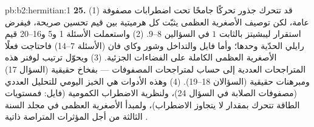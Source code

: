 \begin{solution}{pb:b2:hermitian:1}
\textbf{25.} (1) قد تتحرك جذور 
تحركًا جامحًا تحت اضطرابات مصفوفة عامة، لكن
توصيف الأصغرية العظمى يثبّت كل  هرميتية بين
قيم تحسين صريحة، فيفرض استقرار ليبشيتز
بالثابت $1$ في السؤالين 8--9. (2) واستعملت الأسئلة 1 و5 و16--20
قيم رايلي الحدّية وحدها؛ وأما فايل والتداخل وشور
وكاي فان (الأسئلة 7--14) فاحتاجت فعلًا الأصغرية العظمى
الكاملة على الفضاءات الجزئية. (3) ويحوّل ترتيب لوفنر هذه
المتراجحات العددية إلى حساب لمتراجحات المصفوفات --- بفخاخ
حقيقية (السؤال 17) ومبرهنات حقيقية (السؤالان 18--19).
(4) وهذه الأدوات هي الخبز اليومي للتحليل العددي
(مصفوفات الصلابة في السؤال 24)، ولنظرية الاضطراب
الكمومية (فايل: فمستويات الطاقة تتحرك بمقدار لا يتجاوز 
الاضطراب)، ولمبدأ الأصغرية العظمى في مجلد السنة الثالثة
من أجل المؤثرات المتراصة ذاتية .
\end{solution}
